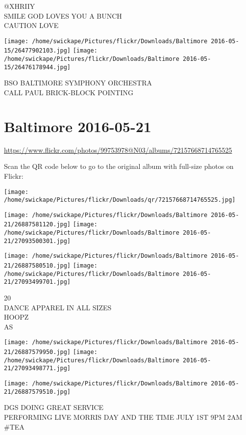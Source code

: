 \documentclass[10pt,letterpaper]{article}
\begin{document}
@XHRIIY\\
SMILE GOD LOVES YOU A BUNCH\\
CAUTION LOVE
\pagebreak

\texttt{[image: /home/swickape/Pictures/flickr/Downloads/Baltimore 2016-05-15/26477902103.jpg]}
\texttt{[image: /home/swickape/Pictures/flickr/Downloads/Baltimore 2016-05-15/26476178944.jpg]}

BSO BALTIMORE SYMPHONY ORCHESTRA\\
CALL PAUL BRICK{-}BLOCK POINTING
\pagebreak

\section*{Baltimore 2016-05-21}

\url{https://www.flickr.com/photos/99753978@N03/albums/72157668714765525}

Scan the QR code below to go to the original album with full-size photos on Flickr:

\texttt{[image: /home/swickape/Pictures/flickr/Downloads/qr/72157668714765525.jpg]}
\pagebreak

\texttt{[image: /home/swickape/Pictures/flickr/Downloads/Baltimore 2016-05-21/26887581120.jpg]}
\texttt{[image: /home/swickape/Pictures/flickr/Downloads/Baltimore 2016-05-21/27093500301.jpg]}

\texttt{[image: /home/swickape/Pictures/flickr/Downloads/Baltimore 2016-05-21/26887580510.jpg]}
\texttt{[image: /home/swickape/Pictures/flickr/Downloads/Baltimore 2016-05-21/27093499701.jpg]}

20\\
DANCE APPAREL IN ALL SIZES\\
HOOPZ\\
AS
\pagebreak

\texttt{[image: /home/swickape/Pictures/flickr/Downloads/Baltimore 2016-05-21/26887579950.jpg]}
\texttt{[image: /home/swickape/Pictures/flickr/Downloads/Baltimore 2016-05-21/27093498771.jpg]}

\vspace{0.25in}
\texttt{[image: /home/swickape/Pictures/flickr/Downloads/Baltimore 2016-05-21/26887579510.jpg]}

DGS DOING GREAT SERVICE\\
PERFORMING LIVE MORRIS DAY AND THE TIME JULY 1ST 9PM 2AM\\
\#TEA
\pagebreak
\end{document}
